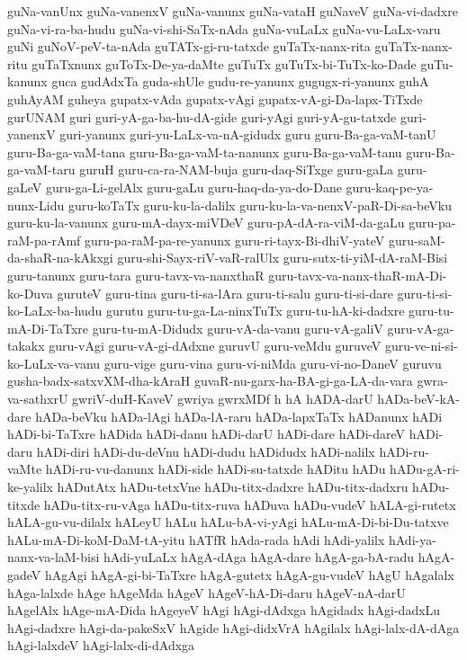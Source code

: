 {guNa-vanUnx
guNa-vanenxV
guNa-vanunx
guNa-vataH
guNaveV
guNa-vi-dadxre
guNa-vi-ra-ba-hudu
guNa-vi-shi-SaTx-nAda
guNa-vuLaLx
guNa-vu-LaLx-varu
guNi
guNoV-peV-ta-nAda
guTATx-gi-ru-tatxde
guTaTx-nanx-rita
guTaTx-nanx-ritu
guTaTxnunx
guToTx-De-ya-daMte
guTuTx
guTuTx-bi-TuTx-ko-Dade
guTu-kanunx
guca
gudAdxTa
guda-shUle
gudu-re-yanunx
gugugx-ri-yanunx
guhA
guhAyAM
guheya
gupatx-vAda
gupatx-vAgi
gupatx-vA-gi-Da-lapx-TiTxde
gurUNAM
guri
guri-yA-ga-ba-hu-dA-gide
guri-yAgi
guri-yA-gu-tatxde
guri-yanenxV
guri-yanunx
guri-yu-LaLx-va-nA-gidudx
guru
guru-Ba-ga-vaM-tanU
guru-Ba-ga-vaM-tana
guru-Ba-ga-vaM-ta-nanunx
guru-Ba-ga-vaM-tanu
guru-Ba-ga-vaM-taru
guruH
guru-ca-ra-NAM-buja
guru-daq-SiTxge
guru-gaLa
guru-gaLeV
guru-ga-Li-gelAlx
guru-gaLu
guru-haq-da-ya-do-Dane
guru-kaq-pe-ya-nunx-Lidu
guru-koTaTx
guru-ku-la-dalilx
guru-ku-la-va-nenxV-paR-Di-sa-beVku
guru-ku-la-vanunx
guru-mA-dayx-miVDeV
guru-pA-dA-ra-viM-da-gaLu
guru-pa-raM-pa-rAmf
guru-pa-raM-pa-re-yanunx
guru-ri-tayx-Bi-dhiV-yateV
guru-saM-da-shaR-na-kAkxgi
guru-shi-Sayx-riV-vaR-ralUlx
guru-sutx-ti-yiM-dA-raM-Bisi
guru-tanunx
guru-tara
guru-tavx-va-nanxthaR
guru-tavx-va-nanx-thaR-mA-Di-ko-Duva
guruteV
guru-tina
guru-ti-sa-lAra
guru-ti-salu
guru-ti-si-dare
guru-ti-si-ko-LaLx-ba-hudu
gurutu
guru-tu-ga-La-ninxTuTx
guru-tu-hA-ki-dadxre
guru-tu-mA-Di-TaTxre
guru-tu-mA-Didudx
guru-vA-da-vanu
guru-vA-galiV
guru-vA-ga-takakx
guru-vAgi
guru-vA-gi-dAdxne
guruvU
guru-veMdu
guruveV
guru-ve-ni-si-ko-LuLx-va-vanu
guru-vige
guru-vina
guru-vi-niMda
guru-vi-no-DaneV
guruvu
gusha-badx-satxvXM-dha-kAraH
guvaR-nu-garx-ha-BA-gi-ga-LA-da-vara
gwra-va-sathxrU
gwriV-duH-KaveV
gwriya
gwrxMDf
h
hA
hADA-darU
hADa-beV-kA-dare
hADa-beVku
hADa-lAgi
hADa-lA-raru
hADa-lapxTaTx
hADanunx
hADi
hADi-bi-TaTxre
hADida
hADi-danu
hADi-darU
hADi-dare
hADi-dareV
hADi-daru
hADi-diri
hADi-du-deVnu
hADi-dudu
hADidudx
hADi-nalilx
hADi-ru-vaMte
hADi-ru-vu-danunx
hADi-side
hADi-su-tatxde
hADitu
hADu
hADu-gA-ri-ke-yalilx
hADutAtx
hADu-tetxVne
hADu-titx-dadxre
hADu-titx-dadxru
hADu-titxde
hADu-titx-ru-vAga
hADu-titx-ruva
hADuva
hADu-vudeV
hALA-gi-rutetx
hALA-gu-vu-dilalx
hALeyU
hALu
hALu-bA-vi-yAgi
hALu-mA-Di-bi-Du-tatxve
hALu-mA-Di-koM-DaM-tA-yitu
hATfR
hAda-rada
hAdi
hAdi-yalilx
hAdi-ya-nanx-va-laM-bisi
hAdi-yuLaLx
hAgA-dAga
hAgA-dare
hAgA-ga-bA-radu
hAgA-gadeV
hAgAgi
hAgA-gi-bi-TaTxre
hAgA-gutetx
hAgA-gu-vudeV
hAgU
hAgalalx
hAga-lalxde
hAge
hAgeMda
hAgeV
hAgeV-hA-Di-daru
hAgeV-nA-darU
hAgelAlx
hAge-mA-Dida
hAgeyeV
hAgi
hAgi-dAdxga
hAgidadx
hAgi-dadxLu
hAgi-dadxre
hAgi-da-pakeSxV
hAgide
hAgi-didxVrA
hAgilalx
hAgi-lalx-dA-dAga
hAgi-lalxdeV
hAgi-lalx-di-dAdxga
}
